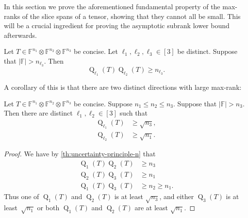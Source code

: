 \documentclass[11pt]{article}
\DeclareMathOperator{\subrank}{Q}
\newcommand{\FF}{\mathbb{F}}
\begin{document}
%

%

%

In this section we prove the aforementioned fundamental property of the max-ranks of the slice spans of a tensor, showing that they cannot all be small. This will be a crucial ingredient for proving the asymptotic subrank lower bound afterwards.

\begin{theorem}\label{th:uncertainty-principle-n}
    Let $T \in \FF^{n_1} \otimes \FF^{n_2} \otimes \FF^{n_3}$ be concise. Let ${\ell_1}, {\ell_2}, {\ell_3} \in [3]$ be distinct. Suppose that $|\FF|>n_{\ell_3}$. Then 
    \[
    \subrank_{\ell_1}(T)\subrank_{\ell_2}(T) \geq n_{\ell_3}.
    \]
\end{theorem}

%

%

%

A corollary of this is that there are two distinct directions with large max-rank:

\begin{corollary} %
\label{cor:twoLargeRankDirs}
    Let $T\in\FF^{n_1}\otimes\FF^{n_2}\otimes\FF^{n_3}$ be concise.
    Suppose $n_1 \leq n_2 \leq n_3$. Suppose that $|\FF| > n_3$. 
    Then there are distinct ${\ell_1},{\ell_2}\in[3]$ such that
    \begin{align*}\subrank_{\ell_1}(T) &\geq \sqrt{n_3},\\
    \subrank_{\ell_2}(T) &\geq \sqrt{n_1}.
    \end{align*}
\end{corollary}
%
\begin{proof}%
    We have by \autoref{th:uncertainty-principle-n} that
    \begin{align*}
    \subrank_1(T) \subrank_2(T) &\geq n_3\\
    \subrank_2(T) \subrank_3(T) &\geq n_1\\
    \subrank_1(T) \subrank_3(T) &\geq n_2 \geq n_1.
    \end{align*}
    Thus one of $\subrank_1(T)$ and $\subrank_2(T)$ is at least $\sqrt{n_3}$, and either $\subrank_3(T)$ is at least~$\sqrt{n_1}$ or both $\subrank_1(T)$ and $\subrank_2(T)$ are at least $\sqrt{n_1}$.
\end{proof}
\end{document}
